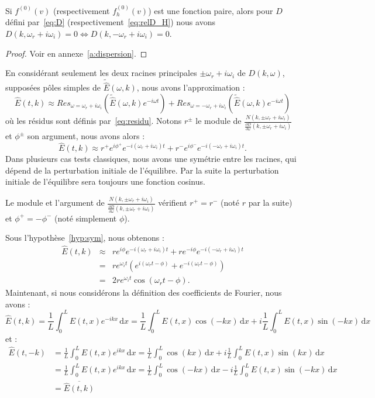 \begin{lemma}
  Si $f^{(0)}(v)$ (respectivement $f_h^{(0)}(v)$) est une fonction paire, alors pour $D$ défini par~\eqref{eq:D} (respectivement~\eqref{eq:relD_H}) nous avons $D(k,\omega_r+i\omega_i) = 0 \Leftrightarrow D(k,-\omega_r+i\omega_i)=0$.
  \label{lemma:doubleracine}
\end{lemma}
\begin{proof}
  Voir en annexe~\ref{a:dispersion}.
\end{proof}

En considérant seulement les deux racines principales $\pm\omega_r + i\omega_i$ de $D(k,\omega)$, supposées pôles simples de $\tilde{\hat{E}}(\omega,k)$, nous avons l'approximation :
$$
  \hat{E}(t,k)\approx Res_{\omega=\omega_r+i\omega_i}\left(\tilde{\hat{E}}(\omega,k)e^{-i\omega t}\right)+Res_{\omega=-\omega_r+i\omega_i}\left(\tilde{\hat{E}}(\omega,k)e^{-i\omega t}\right)
$$
où les résidus sont définis par~\eqref{eq:residu}. Notons $r^\pm$ le module de $\frac{N(k,\pm\omega_r+i\omega_i)}{\frac{\partial D}{\partial \omega}(k,\pm\omega_r+i\omega_i)}$ et $\phi^\pm$ son argument, nous avons alors :
\begin{equation}
  \hat{E}(t,k)\approx r^+e^{i\phi^+}e^{-i(\omega_r+i\omega_i)t}+r^-e^{i\phi^-}e^{-i(-\omega_r+i\omega_i)t}. 
  \label{eq:Etk_sanssym}
\end{equation}
Dans plusieurs cas tests classiques, nous avons une symétrie entre les racines, qui dépend de la perturbation initiale de l'équilibre. Par la suite la perturbation initiale de l'équilibre sera toujours une fonction cosinus.

\begin{hyp}
  Le module et l'argument de $\frac{N(k,\pm\omega_r+i\omega_i)}{\frac{\partial D}{\partial \omega}(k,\pm\omega_r+i\omega_i)}$  vérifient $r^+ = r^-$ (noté $r$ par la suite) et $\phi^+ = -\phi^-$ (noté simplement $\phi$).
  \label{hyp:sym}
\end{hyp}
Sous l'hypothèse~\ref{hyp:sym}, nous obtenons :
\begin{eqnarray}
  \hat{E}(t,k) &\approx& re^{i\phi}e^{-i(\omega_r+i\omega_i)t}+re^{-i\phi}e^{-i(-\omega_r+i\omega_i)t} \nonumber\\
  &=&re^{\omega_i t}\left(e^{i(\omega_r t-\phi)}+e^{-i(\omega_r t-\phi)}\right)\nonumber\\
  &=&2re^{\omega_i t}\cos\left(\omega_r t-\phi\right).
  \label{eq:Etk}
\end{eqnarray}
Maintenant, si nous considérons la définition des coefficients de Fourier, nous avons :
$$
  \hat{E}(t,k) = \frac{1}{L}\int_0^L E(t,x)e^{-ikx}\,\mathrm{d}x = \frac{1}{L}\int_0^L E(t,x)\cos(-kx)\,\mathrm{d}x + i\frac{1}{L}\int_0^L E(t,x)\sin(-kx)\,\mathrm{d}x
$$
et :
$$
  \begin{aligned}
    \hat{E}(t,-k) 
      & = \frac{1}{L}\int_0^L E(t,x)e^{ikx}\,\mathrm{d}x = \frac{1}{L}\int_0^L\cos(kx)\,\mathrm{d}x + i\frac{1}{L}\int_0^L E(t,x)\sin(kx)\,\mathrm{d}x \\
      & = \frac{1}{L}\int_0^L E(t,x)e^{ikx}\,\mathrm{d}x = \frac{1}{L}\int_0^L\cos(-kx)\,\mathrm{d}x - i\frac{1}{L}\int_0^L E(t,x)\sin(-kx)\,\mathrm{d}x \\
      & = \overline{\hat{E}(t,k)}
  \end{aligned}
$$

